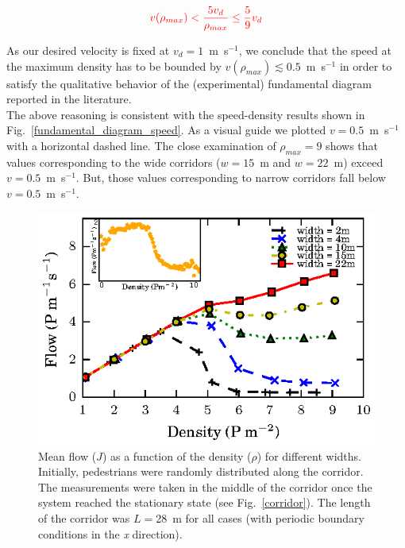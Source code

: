 \documentclass[preprint,12pt]{elsarticle}
\begin{document}

\begin{equation}
\textcolor{red}{v(\rho_{max}) < \frac{5v_d}{\rho_{max}} \leq \frac{5}{9} v_d}\\
\end{equation}

As our desired velocity is fixed at $v_d = 1$~m~s$^{-1}$, we conclude that the speed at 
the maximum density has to be bounded by $v(\rho_{max}) \lesssim  0.5$~m~s$^{-1}$ in 
order to satisfy the qualitative behavior of the (experimental) fundamental 
diagram reported in the literature.\\

The above reasoning is consistent with the speed-density results shown in Fig.~\ref{fundamental_diagram_speed}. As a visual guide we plotted $v=0.5$~m~s$^{-1}$ with a horizontal dashed line. The close examination of $\rho_{max} = 9$ shows that values corresponding to the wide corridors ($w=15$~m and $w=22$~m) exceed $v=0.5$~m~s$^{-1}$. But, those values corresponding to narrow corridors fall below $v=0.5$~m~s$^{-1}$. \\

\begin{figure}[htbp!]
\centering
\includegraphics[width=0.7\columnwidth]
{./flow-density_vd1_multiple_widths.eps}
\caption{\label{fundamental_diagram_flow} Mean flow ($J$) as a function of the 
density ($\rho$) for different widths. Initially, pedestrians were randomly 
distributed along the corridor. The measurements were taken in the middle
of the corridor once the system reached the stationary state (see Fig.~\ref{corridor}). The length of the corridor 
was $L=$28~m for all cases (with periodic boundary conditions in the \textit{x} direction).}
\end{figure}
\end{document}
